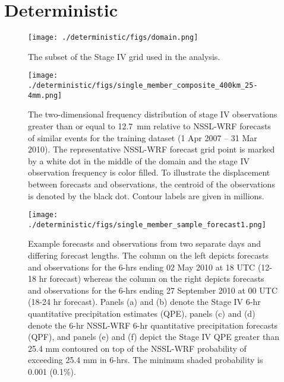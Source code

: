 

\chapter{Deterministic}
\label{deterministic}









\newpage
\begin{figure}[cc]
    \centering
    \texttt{[image: ./deterministic/figs/domain.png]}\\
    \caption{The subset of the Stage IV grid used in the analysis.}
    \label{domain}
\end{figure}


\newpage
\begin{figure}[cc]
    \centering
    \texttt{[image: ./deterministic/figs/single\_member\_composite\_400km\_25-4mm.png]}\\
    \caption{The two-dimensional frequency distribution of stage IV observations greater than or equal to \mbox{12.7 mm} relative to NSSL-WRF forecasts of similar events for the training dataset (1 Apr 2007 -- 31 Mar 2010).
    The representative NSSL-WRF forecast grid point is marked by a white dot in the middle of the domain and the stage IV observation frequency is color filled.
    To illustrate the displacement between forecasts and observations, the centroid of the observations is denoted by the black dot.
    Contour labels are given in millions.}
    \label{single_25thresh}
\end{figure}


\newpage
\begin{figure}[cc]
    \centering
    \texttt{[image: ./deterministic/figs/single\_member\_sample\_forecast1.png]}\\
    \caption{Example forecasts and observations from two separate days and differing forecast lengths.
    The column on the left depicts forecasts and observations for the 6-hrs ending 02 May 2010 at 18 UTC (12-18 hr forecast) whereas the column on the right depicts forecasts and observations for the 6-hrs ending 27 September 2010 at 00 UTC (18-24 hr forecast).
    Panels (a) and (b) denote the Stage IV 6-hr quantitative precipitation estimates (QPE), panels (c) and (d) denote the 6-hr NSSL-WRF 6-hr quantitative precipitation forecasts (QPF), and panels (e) and (f) depict the Stage IV QPE greater than 25.4 mm contoured on top of the NSSL-WRF probability of exceeding 25.4 mm in 6-hrs. The minimum shaded probability is 0.001 (0.1\%).}
    \label{single_sample1}
\end{figure}



